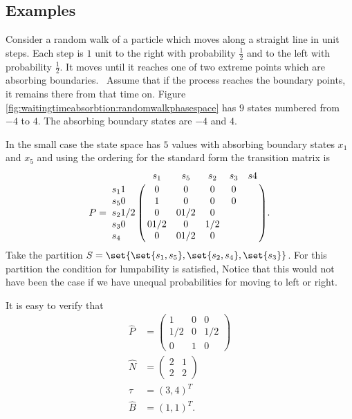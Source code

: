 \documentclass[12pt]{article}
\begin{document}
\subsection*{Examples}

\begin{example}
    Consider a random walk%
    of a particle which moves along a straight line in unit steps.  Each
    step is \( 1 \) unit to the right with probability \( \frac{1}{2} \)
    and to the left with probability \( \frac{1}{2} \).  It moves until
    it reaches one of two extreme points which are absorbing
    boundaries.~%
    Assume that if the process reaches the boundary points, it remains
    there from that time on.  Figure~%
    \ref{fig:waitingtimeabsorbtion:randomwalkphasespace} has \( 9 \)
    states numbered from \( -4 \) to \( 4 \).  The absorbing boundary
    states are \( -4 \) and \( 4 \).

    In the small case the state space has \( 5 \) values with absorbing
    boundary states \( x_1 \) and \( x_5 \) and using the ordering for
    the standard form the transition matrix is
    \[
        P = \bordermatrix{ & s_1 & s_5 & s_2 & s_3 & s4 \cr
        s_1 1 & 0 & 0 & 0 & 0 \cr
        s_5 0 & 1 & 0 & 0 & 0 \cr
        s_2 1/2 & 0 & 0 1/2 & 0 \cr
        s_3 0 & 0 1/2 & 0 & 1/2 \cr
        s_4 & 0 & 0 1/2 & 0 \cr
        }.
    \] Take the partition \( S = \set{ \set{s_1, s_5}, \set{s_2, s_4},
    \set{s_3}} \).  For this partition the condition for lumpabiIity is
    satisfied, Notice that this would not have been the case if we have
    unequal probabilities for moving to left or right.

    It is easy to verify that
    \begin{align*}
        \hat{P} &=
        \begin{pmatrix}
            1 & 0 & 0 \\
            1/2 & 0 & 1/2 \\
            0 & 1 & 0
        \end{pmatrix}
        \\
        \hat{N} &=
        \begin{pmatrix}
            2 & 1 \\
            2 & 2
        \end{pmatrix}
        \\
        \hat{\tau} &= (3, 4)^T \\
        \hat{B} &= (1,1)^T.
    \end{align*}
\end{example}
\end{document}

